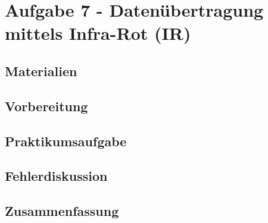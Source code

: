 \section{Aufgabe 7 - Datenübertragung mittels Infra-Rot (IR)}
\label{sec:aufgabe-7---datenübertragung-mittels-infra-rot-ir}

\subsection{Materialien}
\label{subsec:a7-materialien}

\subsection{Vorbereitung}
\label{subsec:a7-vorbereitung}

\subsection{Praktikumsaufgabe}
\label{subsec:a7-praktikumsaufgabe}

\subsection{Fehlerdiskussion}
\label{subsec:a7-fehlerdiskussion}

\subsection{Zusammenfassung}
\label{subsec:a7-zusammenfassung}
